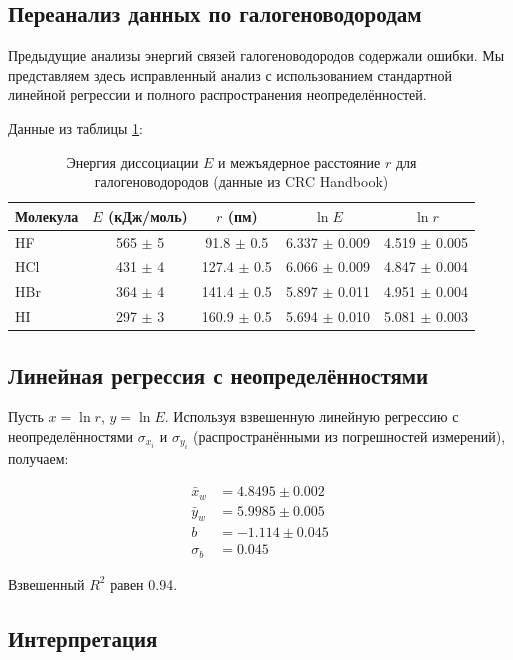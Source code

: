 \documentclass[12pt,a4paper]{article}
\theoremstyle{remark}
\begin{document}
	\subsection{Переанализ данных по галогеноводородам}
	
	Предыдущие анализы энергий связей галогеноводородов содержали ошибки. Мы представляем здесь исправленный анализ с использованием стандартной линейной регрессии и полного распространения неопределённостей.
	
	Данные из таблицы \ref{tab:HX}:
	
	\begin{table}[htbp]
		\centering
		\caption{Энергия диссоциации $E$ и межъядерное расстояние $r$ для галогеноводородов (данные из CRC Handbook)}
		\label{tab:HX}
		\begin{tabular}{lcccc}
			\toprule
			Молекула & $E$ (кДж/моль) & $r$ (пм) & $\ln E$ & $\ln r$ \\
			\midrule
			HF & 565 $\pm$ 5 & 91.8 $\pm$ 0.5 & 6.337 $\pm$ 0.009 & 4.519 $\pm$ 0.005 \\
			HCl & 431 $\pm$ 4 & 127.4 $\pm$ 0.5 & 6.066 $\pm$ 0.009 & 4.847 $\pm$ 0.004 \\
			HBr & 364 $\pm$ 4 & 141.4 $\pm$ 0.5 & 5.897 $\pm$ 0.011 & 4.951 $\pm$ 0.004 \\
			HI  & 297 $\pm$ 3 & 160.9 $\pm$ 0.5 & 5.694 $\pm$ 0.010 & 5.081 $\pm$ 0.003 \\
			\bottomrule
		\end{tabular}
	\end{table}
	
	\subsection{Линейная регрессия с неопределённостями}
	
	Пусть $x = \ln r$, $y = \ln E$. Используя взвешенную линейную регрессию с неопределённостями $\sigma_{x_i}$ и $\sigma_{y_i}$ (распространёнными из погрешностей измерений), получаем:
	
	\begin{align}
		\bar{x}_w &= 4.8495 \pm 0.002 \\
		\bar{y}_w &= 5.9985 \pm 0.005 \\
		b &= -1.114 \pm 0.045 \\
		\sigma_b &= 0.045
	\end{align}
	
	Взвешенный $R^2$ равен 0.94.
	
	\subsection{Интерпретация}
	
\end{document}
